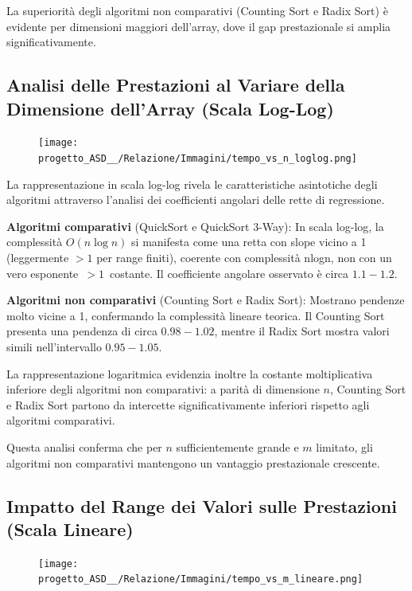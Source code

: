 \documentclass[a4paper, 11pt]{article}
\begin{document}
La superiorità degli algoritmi non comparativi (Counting Sort e Radix Sort) è evidente per dimensioni maggiori dell'array, dove il gap prestazionale si amplia significativamente.

\subsection{Analisi delle Prestazioni al Variare della Dimensione dell'Array (Scala Log-Log)}
\begin{figure}[H]
\centering
\texttt{[image: progetto\_ASD\_\_/Relazione/Immagini/tempo\_vs\_n\_loglog.png]}
\label{fig:variazione_m}
\end{figure}

La rappresentazione in scala log-log rivela le caratteristiche asintotiche degli algoritmi attraverso l'analisi dei coefficienti angolari delle rette di regressione.

\textbf{Algoritmi comparativi} (QuickSort e QuickSort 3-Way): In scala log-log, la complessità $O(n \log n)$ si manifesta come una retta con slope vicino a 1 (leggermente $>1$ per range finiti), coerente con complessità nlogn, non con un vero esponente $>1$ costante. Il coefficiente angolare osservato è circa $1.1 - 1.2$.

\textbf{Algoritmi non comparativi} (Counting Sort e Radix Sort): Mostrano pendenze molto vicine a 1, confermando la complessità lineare teorica. Il Counting Sort presenta una pendenza di circa $0.98 - 1.02$, mentre il Radix Sort mostra valori simili nell'intervallo $0.95 - 1.05$.

La rappresentazione logaritmica evidenzia inoltre la costante moltiplicativa inferiore degli algoritmi non comparativi: a parità di dimensione $n$, Counting Sort e Radix Sort partono da intercette significativamente inferiori rispetto agli algoritmi comparativi.

Questa analisi conferma che per $n$ sufficientemente grande e $m$ limitato, gli algoritmi non comparativi mantengono un vantaggio prestazionale crescente.

\subsection{Impatto del Range dei Valori sulle Prestazioni (Scala Lineare)}
\begin{figure}[H]
\centering
\texttt{[image: progetto\_ASD\_\_/Relazione/Immagini/tempo\_vs\_m\_lineare.png]}
\label{fig:variazione_m}
\end{figure}
\end{document}
